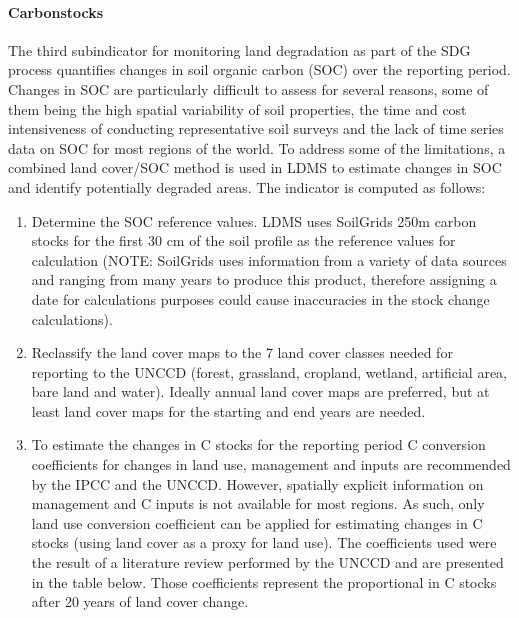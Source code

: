 \documentclass[letterpaper,10pt,english]{sphinxmanual}
\begin{document}
\paragraph{Carbon\sphinxhyphen{}stocks}
\label{\detokenize{Background/LD_indicators:carbon-stocks}}
\sphinxAtStartPar
The third sub\sphinxhyphen{}indicator for monitoring land degradation as part of the SDG
process quantifies changes in soil organic carbon (SOC) over the reporting
period. Changes in SOC are particularly difficult to assess for several
reasons, some of them being the high spatial variability of soil properties,
the time and cost intensiveness of conducting representative soil surveys and
the lack of time series data on SOC for most regions of the world. To address
some of the limitations, a combined land cover/SOC method is used in
LDMS to estimate changes in SOC and identify potentially degraded
areas. The indicator is computed as follows:
\begin{enumerate}
%
\item {} 
\sphinxAtStartPar
Determine the SOC reference values. LDMS uses SoilGrids 250m
carbon stocks for the first 30 cm of the soil profile as the reference
values for calculation (NOTE: SoilGrids uses information from a variety of
data sources and ranging from many years to produce this product, therefore
assigning a date for calculations purposes could cause inaccuracies in the
stock change calculations).

\item {} 
\sphinxAtStartPar
Reclassify the land cover maps to the 7 land cover classes needed for
reporting to the UNCCD (forest, grassland, cropland, wetland, artificial
area, bare land and water). Ideally annual land cover maps are preferred,
but at least land cover maps for the starting and end years are needed.

\item {} 
\sphinxAtStartPar
To estimate the changes in C stocks for the reporting period C conversion
coefficients for changes in land use, management and inputs are recommended
by the IPCC and the UNCCD. However, spatially explicit information on
management and C inputs is not available for most regions. As such, only
land use conversion coefficient can be applied for estimating changes in C
stocks (using land cover as a proxy for land use). The coefficients used
were the result of a literature review performed by the UNCCD and are
presented in the table below. Those coefficients represent the proportional
in C stocks after 20 years of land cover change.

\end{enumerate}
\end{document}
